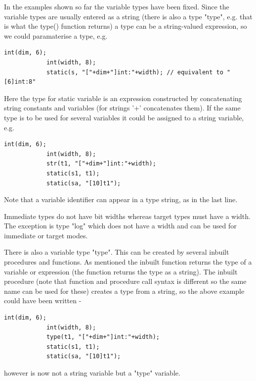         In the examples shown so far the variable types have been fixed. Since
        the variable types are usually entered as a string (there is also a type
        "type", e.g. that is what the type() function returns) a type can be
        a string-valued expression, so we could paramaterise a type, e.g.
        \begin{lstlisting}[language=threepl]
            int(dim, 6);
            int(width, 8);
            static(s, "["+dim+"]int:"+width); // equivalent to "[6]int:8"
        \end{lstlisting}
        Here the type for static variable  is an expression constructed by
        concatenating string constants and variables (for strings '+' concatenates
        them). If the same type is to be used for several variables it could be
        assigned to a string variable, e.g.
        \begin{lstlisting}[language=threepl]
            int(dim, 6);
            int(width, 8);
            str(t1, "["+dim+"]int:"+width);
            static(s1, t1);
            static(sa, "[10]t1");
        \end{lstlisting}
        Note that a variable identifier can appear in a type string, as in the last
        line.

        Immediate types do not have bit widths whereas target types must have a
        width. The exception is type "log" which does not have a width and can be
        used for immediate or target modes.

        There is also a variable type "type". This can be created by several
        inbuilt procedures and functions. As mentioned the inbuilt function
         returns the type of a variable or expression (the function
         returns the type as a string). The inbuilt
        procedure
         (note that function and procedure call syntax is different so
        the same name can be used for these) creates a type from a string, so the
        above example could have been written -
        \begin{lstlisting}[language=threepl]
            int(dim, 6);
            int(width, 8);
            type(t1, "["+dim+"]int:"+width);
            static(s1, t1);
            static(sa, "[10]t1");
        \end{lstlisting}
        however  is now not a string variable but a "type" variable.

